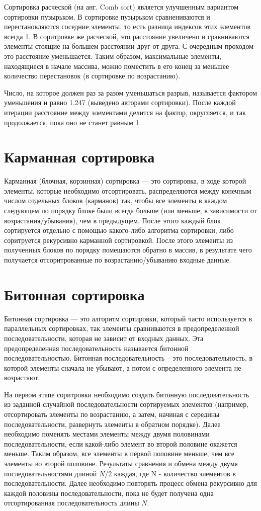 \documentclass[12pt]{report}
\begin{document}
	 Сортировка расческой (на анг. Comb sort) является улучшенным вариантом сортировки пузырьком. В сортировке пузырьком сравнениваются и перестановляются соседние элементы, то есть разница индексов этих элементов всегда 1. В соритровке же расческой, это расстояние увеличено и сравниваются элементы стоящие на большем расстоянии друг от друга. С очередным проходом это расстояние уменьшается. Таким образом, максимальные элементы, находящиеся в начале массива, можно поместить в его конец за меньшее количество перестановок (в сортировке по возрастанию). 
	 
	 Число, на которое должен раз за разом уменьшаться разрыв, называется фактором уменьшения и равно 1.247 (выведено авторами сортировки). После каждой итерации расстояние между элементами делится на фактор, округляется, и так продолжается, пока оно не станет равным 1.
	
	\section{Карманная сортировка}
	
	Карманная (блочная, корзинная) сортировка — это сортировка, в ходе которой элементы, которые необходимо отсортировать, распределяются между конечным числом отдельных блоков (карманов) так, чтобы все элементы в каждом следующем по порядку блоке были всегда больше (или меньше, в зависимости от возрастания/убывания), чем в предыдущем. После этого каждый блок сортируется отдельно с помощью какого-либо алгоритма сортировки, либо соритруется рекурсивно карманной сортировкой. После этого элементы из полученных блоков по порядку помещаются обратно в массив, в результате чего получается отсоритрованные по возрастанию/убыванию входные данные.

	
	\section{Битонная сортировка}
	
	Битонная сортировка — это алгоритм сортировки, который часто используется в параллельных сортировках, так элементы сравниваются в предопределенной последовательности, которая не зависит от входных данных. Эта предопределенная последовательность называется битонной последовательностью. Битонная последовательность -- это последовательность, в которой элементы сначала не убывают, а потом с определенного элемента не возрастают.
	
	На первом этапе соритровки необходимо создать битонную последовательность из заданной случайной последовательности сортируемых элементов (например, отсортировать элементы по возрастанию, а затем, начиная с середины последовательности, развернуть элементы в обратном порядке). Далее необходимо поменять местами элементы между двумя половинами последовательности, если какой-либо элемент во второй половине окажется меньше. Таким образом, все элементы в первой половине меньше, чем все элементы во второй половине. Результаты сравнения и обмена между двумя последовательностями длиной $N/2$ каждая, где N - количество элементов в последовательности. Далее необходимо повторять процесс обмена рекурсивно для каждой половины последовательности, пока не будет получена одна отсортированная последовательность длины $N$.
	
\end{document}
